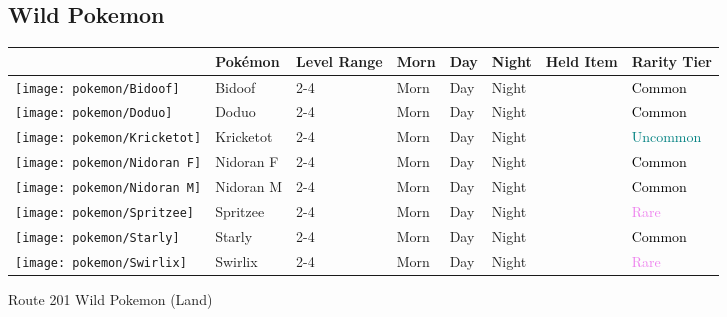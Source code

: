 \subsection{Wild Pokemon}%
\label{subsec:WildPokemon}%
\begin{longtable}{||l l l l l l l l||}%
\hline%
&Pokémon&Level Range&Morn&Day&Night&Held Item&Rarity Tier\\%
\hline%
\endhead%
\hline%
\texttt{[image: pokemon/Bidoof]}&Bidoof&2{-}4&Morn&Day&Night&&\textcolor{black}{%
Common%
}\\%
\hline%
\texttt{[image: pokemon/Doduo]}&Doduo&2{-}4&Morn&Day&Night&&\textcolor{black}{%
Common%
}\\%
\hline%
\texttt{[image: pokemon/Kricketot]}&Kricketot&2{-}4&Morn&Day&Night&&\textcolor{teal}{%
Uncommon%
}\\%
\hline%
\texttt{[image: pokemon/Nidoran F]}&Nidoran F&2{-}4&Morn&Day&Night&&\textcolor{black}{%
Common%
}\\%
\hline%
\texttt{[image: pokemon/Nidoran M]}&Nidoran M&2{-}4&Morn&Day&Night&&\textcolor{black}{%
Common%
}\\%
\hline%
\texttt{[image: pokemon/Spritzee]}&Spritzee&2{-}4&Morn&Day&Night&&\textcolor{violet}{%
Rare%
}\\%
\hline%
\texttt{[image: pokemon/Starly]}&Starly&2{-}4&Morn&Day&Night&&\textcolor{black}{%
Common%
}\\%
\hline%
\texttt{[image: pokemon/Swirlix]}&Swirlix&2{-}4&Morn&Day&Night&&\textcolor{violet}{%
Rare%
}\\%
\hline%
\end{longtable}%
\caption{Route 201 Wild Pokemon (Land)}
